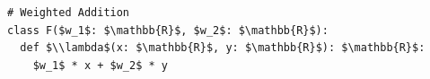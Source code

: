 \documentclass[border=10pt]{standalone}
\begin{document}
\begin{lstlisting}
# Weighted Addition
class F($w_1$: $\mathbb{R}$, $w_2$: $\mathbb{R}$):
  def $\\lambda$(x: $\mathbb{R}$, y: $\mathbb{R}$): $\mathbb{R}$:
    $w_1$ * x + $w_2$ * y
\end{lstlisting}
\end{document}
